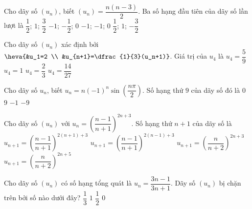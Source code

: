 \begin{ex}%
	Cho dãy số $(u_n)$, biết $(u_n)=\dfrac{n(n-3)}{2}$. Ba số hạng  đầu tiên của dãy số lần lượt là
	 \choice
		 {$\dfrac{1}{2}$; $1$; $\dfrac{3}{2}$}
		{$-1$;  $-\dfrac{1}{2}$; $0$}
		{\True  $-1$; $-1$; $0$}
		 {$\dfrac{1}{2}$; $1$; $-\dfrac{3}{2}$}
\end{ex}

\begin{ex}%
	Cho dãy  số $(u_n)$ xác định bởi
	$\heva{&u_1=2  \\
	&u_{n+1}=\dfrac{1}{3}(u_n+1)}$.  Giá trị của $u_4$ là
	 \choice
		{\True $u_4=\dfrac{5}{9}$} 
		 {$u_4=1$}
		 {$u_4=\dfrac{2}{3}$}
		 {$u_4=\dfrac{14}{27}$}
\end{ex}

\begin{ex}%
	Cho dãy số $u_n$, biết $u_n=n(-1)^n \sin \left(\dfrac{n \pi}{2}\right)$. Số hạng thứ $9$ của dãy số đó là 
	\choice 
		 {$0$}
		{$9$} 
		 {$-1$}
		 {\True $-9$}
\end{ex}

\begin{ex}%
	Cho dãy số $(u_n)$ với $u_n=\left(\dfrac{n-1}{n+1}\right)^{2n+3}$. Số hạng thứ $n+1$ của  dãy số là
	 \choice
		 {$u_{n+1}=\left(\dfrac{n-1}{n+1}\right)^{2(n+1)+3}$}
		{$u_{n+1}=\left(\dfrac{n-1}{n+1}\right)^{2(n-1)+3}$} 
		{$u_{n+1}=\left(\dfrac{n}{n+2}\right)^{2n+3}$} 
		 {\True $u_{n+1}=\left(\dfrac{n}{n+2}\right)^{2n+5}$}
\end{ex}

\begin{ex}%
	Cho dãy số $(u_n)$ có số hạng tổng quát là $u_n = \dfrac{3n - 1}{3n + 1}$. Dãy số $(u_n)$ bị chặn trên bởi số nào  dưới đây?
	\choice 
		 {$\dfrac{1}{3}$}
		 {\True $1$}
		{$\dfrac{1}{2}$} 
		 {$0$}
\end{ex}

